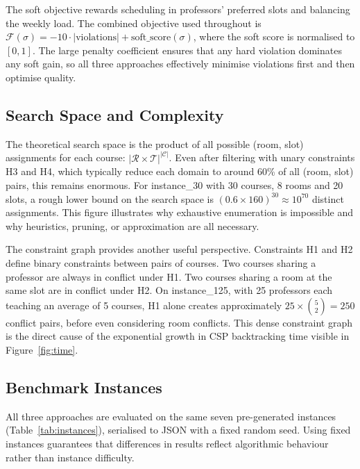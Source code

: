 \documentclass[letterpaper]{article}
\begin{document}
The soft objective rewards scheduling in professors' preferred slots and balancing the weekly load. The combined objective used throughout is $\mathcal{F}(\sigma) = -10 \cdot |\text{violations}| + \text{soft\_score}(\sigma)$, where the soft score is normalised to $[0,1]$. The large penalty coefficient ensures that any hard violation dominates any soft gain, so all three approaches effectively minimise violations first and then optimise quality.

\subsection{Search Space and Complexity}

The theoretical search space is the product of all possible (room, slot) assignments for each course: $|\mathcal{R} \times \mathcal{T}|^{|\mathcal{C}|}$. Even after filtering with unary constraints H3 and H4, which typically reduce each domain to around 60\% of all (room, slot) pairs, this remains enormous. For instance\_30 with 30 courses, 8 rooms and 20 slots, a rough lower bound on the search space is $(0.6 \times 160)^{30} \approx 10^{70}$ distinct assignments. This figure illustrates why exhaustive enumeration is impossible and why heuristics, pruning, or approximation are all necessary.

The constraint graph provides another useful perspective. Constraints H1 and H2 define binary constraints between pairs of courses. Two courses sharing a professor are always in conflict under H1. Two courses sharing a room at the same slot are in conflict under H2. On instance\_125, with 25 professors each teaching an average of 5 courses, H1 alone creates approximately $25 \times \binom{5}{2} = 250$ conflict pairs, before even considering room conflicts. This dense constraint graph is the direct cause of the exponential growth in CSP backtracking time visible in Figure~\ref{fig:time}.

\subsection{Benchmark Instances}

All three approaches are evaluated on the same seven pre-generated instances (Table~\ref{tab:instances}), serialised to JSON with a fixed random seed. Using fixed instances guarantees that differences in results reflect algorithmic behaviour rather than instance difficulty.
\end{document}
